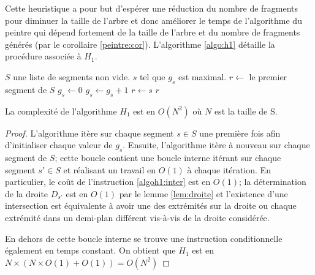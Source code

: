 Cette heuristique a pour but d'espérer une réduction du nombre de fragments
pour diminuer la taille de l'arbre
et donc améliorer le temps de l'algorithme du peintre qui dépend
fortement de la taille de l'arbre et du nombre de fragments générés (par
le corollaire \ref{peintre:cor}). L'algorithme \ref{algo:h1} détaille
la procédure associée à $H_1$.

\begin{algorithm}
  \caption{$H_1$($S$)}
  \begin{algorithmic}[1] \label{algo:h1}
    \REQUIRE $S$ une liste de segments non vide.
    \ENSURE $s$ tel que $g_s$ est maximal.
    \STATE$r\leftarrow$ le premier segment de $S$
    \STATE $g_s\leftarrow 0$
    \ENDFOR
    \label{algoh1:inter}
    \STATE $g_s\leftarrow g_s +1$
    \ENDIF
    \ENDFOR
    \STATE $r\leftarrow s$
    \ENDIF
    \ENDFOR
    \RETURN $r$
  \end{algorithmic}
\end{algorithm}

\begin{prop}
  La complexité de l'algorithme $H_1$ est en $O(N^2)$ où $N$ est la taille de S.
\end{prop}
\begin{proof}
  L'algorithme itère sur chaque segment $s \in S$ une première fois afin
  d'initialiser chaque valeur de $g_s$. Ensuite, l'algorithme itère à nouveau
  sur chaque segment de $S$; cette boucle contient une boucle interne
  itérant sur chaque segment $s' \in S$ et réalisant un travail en $O(1)$
  à chaque itération. En particulier, le coût de l'instruction
  \ref{algoh1:inter} est en $O(1)$; la détermination de la
  droite $D_{s'}$ est en $O(1)$ par le lemme \ref{lem:droite} et
  l'existence d'une intersection est équivalente à avoir une des
  extrémités sur la droite ou chaque extrémité dans un demi-plan
  différent vis-à-vis de la droite considérée.


  En dehors de cette boucle interne se trouve une instruction
  conditionnelle également en temps constant.
  On obtient que $H_1$ est en $N\times(N\times{}O(1) + O(1)) = O(N^2)$
\end{proof}



